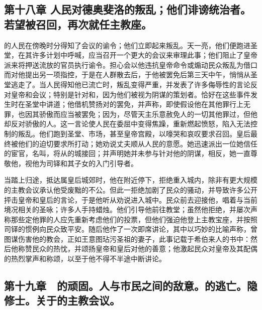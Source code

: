 
\subsection{第十八章 人民对德奥斐洛的叛乱；他们诽谤统治者。若望被召回，再次就任主教座。}

的人民在傍晚时分得知了会议的谕令；他们立即起来叛乱。天一亮，他们便跑进圣堂，在其许多计划中呼喊，应当召开一个更大的会议来审理此事；他们阻止了皇帝派来将押送流放的官员执行谕令。担心会以他违抗皇帝命令或煽动民众叛乱为借口而对他提出另一项指控，于是在人群散去后，于他被罢免后第三天中午，悄悄从圣堂逃走了。当人民得知他已流亡时，叛乱变得严重，并发表了许多侮辱性的言论反对皇帝和会议；特别是针对和，因为他们被视为阴谋的策划者。恰好在这些事件发生时在圣堂中讲道；他借机赞扬对的罢免，并声称，即使假设他在其他罪行上无罪，也因其骄傲而应当被罢免；因为，尽管天主乐意赦免人的一切其他罪过，但他却反对骄傲的人。这一言论使人民在委屈中变得焦躁，重新燃起愤怒，陷入无法控制的叛乱。他们跑到圣堂、市场，甚至皇帝宫殿，以嚎哭和哀叹要求召回。皇后最终被他们的迫切要求所打动；她劝说丈夫顺从人民的意愿。她迅速派出一位她信任的宦官，名叫，将从的城接回；并声明她并未参与针对他的阴谋，相反，她一直尊敬他，视他为司铎和其子女的入门引导者。\par

当踏上归途，抵达属皇后城郊时，他在附近停下，拒绝重入城内，除非有更大规模的主教会议承认他受废黜的不公。但此一拒绝加剧了民众的骚动，并导致许多公开抨击皇帝和皇后的言论，于是他听从劝说进入城中。民众前去迎接他，唱着与当前境况相关的圣咏；许多人手持蜡烛。他们引导他前往教堂；虽然他拒绝，并屡次声称那些定他罪的人应先重新考虑他们的投票，但他们强迫他登上主教宝座，并按照司铎的惯例向民众致平安。随后他作了一次即席讲论，其中以巧妙的比喻声称，曾图谋伤害他的教会，正如王意图玷污圣祖的妻子，此事记载于希伯来人的书中：然后他称赞民众的热忱，并颂扬皇帝和皇后对他的善意；他激起民众对皇帝及其配偶的热烈掌声和称颂，以至于他不得不半途中断讲论。\par


\subsection{第十九章　的顽固。人与市民之间的敌意。的逃亡。隐修士。关于的主教会议。}

